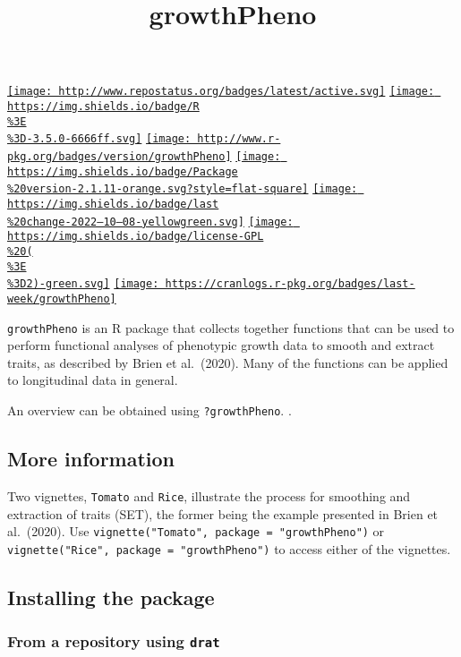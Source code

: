 \documentclass[
]{article}
\title{growthPheno}
\author{}
\date{\vspace{-2.5em}}
\begin{document}
\maketitle

\href{http://www.repostatus.org/\#active}{\texttt{[image: http://www.repostatus.org/badges/latest/active.svg]}}
\href{https://cran.r-project.org/}{\texttt{[image: https://img.shields.io/badge/R\\\%3E\\\%3D-3.5.0-6666ff.svg]}}
\href{https://cran.r-project.org/package=growthPheno}{\texttt{[image: http://www.r-pkg.org/badges/version/growthPheno]}}
\href{/commits/master}{\texttt{[image: https://img.shields.io/badge/Package\\\%20version-2.1.11-orange.svg?style=flat-square]}}
\href{/commits/master}{\texttt{[image: https://img.shields.io/badge/last\\\%20change-2022--10--08-yellowgreen.svg]}}
\href{http://choosealicense.com/licenses/gpl-2.0/}{\texttt{[image: https://img.shields.io/badge/license-GPL\\\%20(\\\%3E\\\%3D2)-green.svg]}}
\href{commits/master}{\texttt{[image: https://cranlogs.r-pkg.org/badges/last-week/growthPheno]}}

\texttt{growthPheno} is an R package that collects together functions
that can be used to perform functional analyses of phenotypic growth
data to smooth and extract traits, as described by Brien et al.~(2020).
Many of the functions can be applied to longitudinal data in general.

An overview can be obtained using \texttt{?growthPheno}. .

\hypertarget{more-information}{%
\subsection{More information}\label{more-information}}

Two vignettes, \texttt{Tomato} and \texttt{Rice}, illustrate the process
for smoothing and extraction of traits (SET), the former being the
example presented in Brien et al.~(2020). Use
\texttt{vignette("Tomato",\ package\ =\ "growthPheno")} or
\texttt{vignette("Rice",\ package\ =\ "growthPheno")} to access either
of the vignettes.

\hypertarget{installing-the-package}{%
\subsection{Installing the package}\label{installing-the-package}}

\hypertarget{from-a-repository-using-drat}{%
\subsubsection{\texorpdfstring{From a repository using
\texttt{drat}}{From a repository using drat}}\label{from-a-repository-using-drat}}
\end{document}
